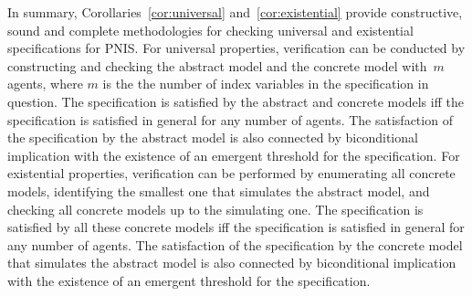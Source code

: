 In summary, Corollaries~\ref{cor:universal} and~\ref{cor:existential} provide
constructive, sound and complete methodologies for checking universal and 
existential specifications for PNIS.  For universal properties, verification can
be conducted by constructing and checking the abstract model and the concrete
model with~$m$ agents, where $m$ is the the number of index variables in the
specification in question. The specification is satisfied by the abstract and
concrete models iff the specification is satisfied in general for any number of
agents.  The satisfaction of the specification by the abstract model is also
connected by biconditional implication with the existence of an emergent
threshold for the specification. For existential properties, verification can be
performed by enumerating all concrete models, identifying the smallest one that simulates the abstract model,
 and checking all concrete models up to the simulating one. 
 The specification is satisfied by all these
concrete models iff the specification is satisfied in general for any number of
agents.   The satisfaction of the specification by the concrete model that
simulates the abstract model is also connected by biconditional implication with
the existence of an emergent threshold for the specification. 








